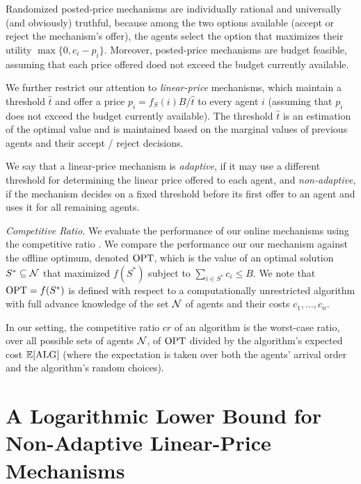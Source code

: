 Randomized posted-price mechanisms are individually rational and universally (and obviously) truthful, because among the two options available (accept or reject the mechanism's offer), the agents select the option that maximizes their utility $\max\{ 0, c_i - p_i \}$. Moreover, posted-price mechanisms are budget feasible, assuming that each price offered doed not exceed the budget currently available. 

We further restrict our attention to \emph{linear-price} mechanisms, which maintain a threshold $\hat{t}$ and offer a price $p_i = f_S(i) B / \hat{t}$ to every agent $i$ (assuming that $p_i$ does not exceed the budget currently available). The threshold $\hat{t}$ is an estimation of the optimal value and is maintained based on the marginal values of previous agents and their accept / reject decisions. 

We say that a linear-price mechanism is \emph{adaptive}, if it may use  a different threshold for determining the linear price offered to each agent, and \emph{non-adaptive}, if the mechanism decides on a fixed threshold before its first offer to an agent and uses it for all remaining agents.

\vskip2pt\textit{Competitive Ratio.}
%
We evaluate the performance of our online mechanisms using the competitive ratio \cite{BoroYan1998}. We compare the performance our our mechanism against the offline optimum, denoted $\mathrm{OPT}$, which is the value of an optimal solution $S^\ast \subseteq \mathcal{N}$ that maximized $f(S^\ast)$ subject to $\sum_{i \in S^\ast} c_i \leq B$. We note that $\mathrm{OPT} = f(S^\ast)$ is defined with respect to a computationally unrestricted algorithm with full advance knowledge of the set $\mathcal{N}$ of agents and their costs $c_1, \ldots, c_n$. 

In our setting, the competitive ratio $cr$ of an algorithm is the worst-case ratio, over all possible sets of agents $\mathcal{N}$, of $\mathrm{OPT}$ divided by the algorithm's expected cost $\mathbb{E}[\mathrm{ALG}]$ (where the expectation is taken over both the agents' arrival order and the algorithm's random choices). 



\section{A Logarithmic Lower Bound for Non-Adaptive Linear-Price Mechanisms}
\label{sec:lower_bound}

